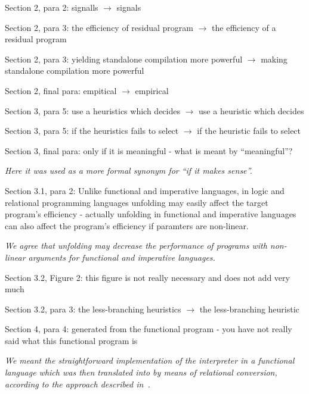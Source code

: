 Section 2, para 2: signalls $\to$ signals

Section 2, para 3: the efficiency of residual program $\to$ the efficiency of a residual program

Section 2, para 3: yielding standalone compilation more powerful $\to$ making standalone compilation more powerful

Section 2, final para: empitical $\to$ empirical

Section 3, para 5: use a heuristics which decides $\to$  use a heuristic which decides

Section 3, para 5: if the heuristics fails to select $\to$ if the heuristic fails to select



Section 3, final para: only if it is meaningful - what is meant by ``meaningful''?

\emph{Here it was used as a more formal synonym for ``if it makes sense''.}

Section 3.1, para 2: Unlike functional and imperative languages, in logic and relational programming languages unfolding
may easily affect the target program’s efficiency - actually unfolding in functional and imperative languages can also
affect the program's efficiency if paramters are non-linear.

\emph{We agree that unfolding may decrease the performance of programs with non-linear arguments for functional and imperative languages. }


Section 3.2, Figure 2: this figure is not really necessary and does not add very much

Section 3.2, para 3: the less-branching heuristics $\to$ the less-branching heuristic

Section 4, para 4: generated from the functional program - you have not really said what this functional program is

\emph{We meant the straightforward implementation of the interpreter in a functional language which was then translated into \mk by means of relational conversion, according to the approach described in~\cite{lozov2019relational}.}

